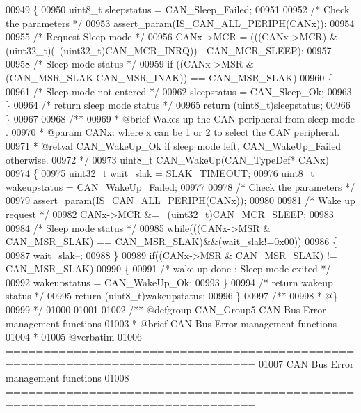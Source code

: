 \begin{DoxyCode}
00949 \{
00950   uint8\_t sleepstatus = CAN_Sleep_Failed;
00951 
00952   \textcolor{comment}{/* Check the parameters */}
00953   assert_param(IS\_CAN\_ALL\_PERIPH(CANx));
00954 
00955   \textcolor{comment}{/* Request Sleep mode */}
00956    CANx->MCR = (((CANx->MCR) & (uint32\_t)(~(uint32\_t)CAN_MCR_INRQ)) | 
      CAN_MCR_SLEEP);
00957 
00958   \textcolor{comment}{/* Sleep mode status */}
00959   \textcolor{keywordflow}{if} ((CANx->MSR & (CAN_MSR_SLAK|CAN_MSR_INAK)) == CAN_MSR_SLAK)
00960   \{
00961     \textcolor{comment}{/* Sleep mode not entered */}
00962     sleepstatus =  CAN_Sleep_Ok;
00963   \}
00964   \textcolor{comment}{/* return sleep mode status */}
00965    \textcolor{keywordflow}{return} (uint8\_t)sleepstatus;
00966 \}
00967 
00968 \textcolor{comment}{/**}
00969 \textcolor{comment}{  * @brief  Wakes up the CAN peripheral from sleep mode .}
00970 \textcolor{comment}{  * @param  CANx: where x can be 1 or 2 to select the CAN peripheral.}
00971 \textcolor{comment}{  * @retval CAN\_WakeUp\_Ok if sleep mode left, CAN\_WakeUp\_Failed otherwise.}
00972 \textcolor{comment}{  */}
00973 uint8\_t CAN_WakeUp(CAN\_TypeDef* CANx)
00974 \{
00975   uint32\_t wait\_slak = SLAK_TIMEOUT;
00976   uint8\_t wakeupstatus = CAN_WakeUp_Failed;
00977 
00978   \textcolor{comment}{/* Check the parameters */}
00979   assert_param(IS\_CAN\_ALL\_PERIPH(CANx));
00980 
00981   \textcolor{comment}{/* Wake up request */}
00982   CANx->MCR &= ~(uint32\_t)CAN_MCR_SLEEP;
00983 
00984   \textcolor{comment}{/* Sleep mode status */}
00985   \textcolor{keywordflow}{while}(((CANx->MSR & CAN_MSR_SLAK) == CAN_MSR_SLAK)&&(wait\_slak!=0x00))
00986   \{
00987    wait\_slak--;
00988   \}
00989   \textcolor{keywordflow}{if}((CANx->MSR & CAN_MSR_SLAK) != CAN_MSR_SLAK)
00990   \{
00991    \textcolor{comment}{/* wake up done : Sleep mode exited */}
00992     wakeupstatus = CAN_WakeUp_Ok;
00993   \}
00994   \textcolor{comment}{/* return wakeup status */}
00995   \textcolor{keywordflow}{return} (uint8\_t)wakeupstatus;
00996 \}
00997 \textcolor{comment}{/**}
00998 \textcolor{comment}{  * @\}}
00999 \textcolor{comment}{  */}
01000 
01001 
01002 \textcolor{comment}{/** @defgroup CAN\_Group5 CAN Bus Error management functions}
01003 \textcolor{comment}{ *  @brief    CAN Bus Error management functions }
01004 \textcolor{comment}{ *}
01005 \textcolor{comment}{@verbatim    }
01006 \textcolor{comment}{ ===============================================================================}
01007 \textcolor{comment}{                      CAN Bus Error management functions}
01008 \textcolor{comment}{ ===============================================================================  }

\end{DoxyCode}
